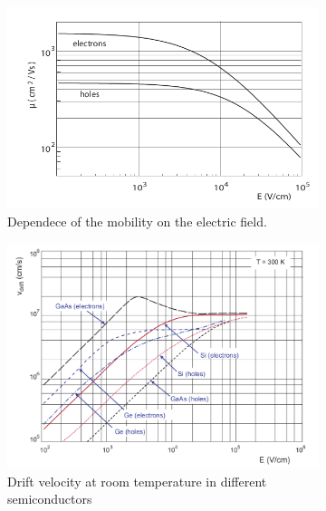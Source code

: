    \begin{figure}
      \centering
      \begin{subfigure}[b]{0.49\textwidth}
          \centering
          \includegraphics[width=\linewidth]{figures/Pixel_detectors/mobility_in_semiconductor.png}
          \caption{Dependece of the mobility on the electric field.}
          \label{fig:mobility}
      \end{subfigure}
      \hfill
      \begin{subfigure}[b]{0.49\textwidth}
          \centering
          \includegraphics[width=\linewidth]{figures/Pixel_detectors/velocity_in_semiconductor.png}          
          \caption{Drift velocity at room temperature in different semiconductors}
          \label{fig:Drift_velocity}
      \end{subfigure}
         \caption{}
         \label{fig:mobility_drift}
 \end{figure}
 
